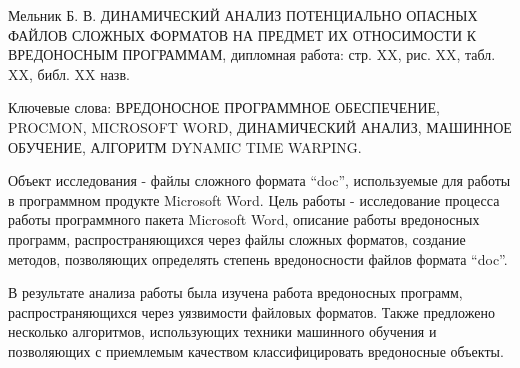 
Мельник Б. В. ДИНАМИЧЕСКИЙ АНАЛИЗ ПОТЕНЦИАЛЬНО ОПАСНЫХ ФАЙЛОВ СЛОЖНЫХ ФОРМАТОВ НА ПРЕДМЕТ ИХ ОТНОСИМОСТИ К ВРЕДОНОСНЫМ ПРОГРАММАМ, дипломная работа: стр. XX, рис. XX, табл. XX, библ. XX назв.

Ключевые слова: ВРЕДОНОСНОЕ ПРОГРАММНОЕ ОБЕСПЕЧЕНИЕ, PROCMON, MICROSOFT WORD, ДИНАМИЧЕСКИЙ АНАЛИЗ, МАШИННОЕ ОБУЧЕНИЕ, АЛГОРИТМ DYNAMIC TIME WARPING.

Объект исследования - файлы сложного формата “doc”, используемые для работы в программном продукте Microsoft Word.
Цель работы - исследование процесса работы программного пакета Microsoft Word, описание работы вредоносных программ, распространяющихся через файлы сложных форматов, создание методов, позволяющих определять степень вредоносности файлов формата “doc”.

В результате анализа работы была изучена работа вредоносных программ, распространяющихся через уязвимости файловых форматов. Также предложено несколько алгоритмов, использующих техники машинного обучения и позволяющих с приемлемым качеством классифицировать вредоносные объекты.
